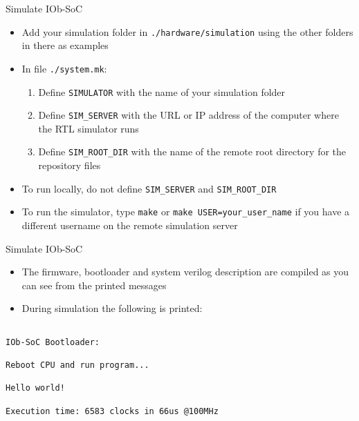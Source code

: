 \documentclass [xcolor=svgnames, t] {beamer}
\begin{document}
\begin{frame}[fragile]{Simulate IOb-SoC}
\begin{itemize}
  \item Add your simulation folder in {\tt ./hardware/simulation} using the other folders in there as examples
  \item In  file {\tt ./system.mk}:
  \begin{enumerate}
    \item Define {\tt SIMULATOR} with the name of your simulation folder
    \item Define {\tt SIM\_SERVER} with the URL or IP address of the computer where the RTL simulator runs
    \item Define {\tt SIM\_ROOT\_DIR} with the name of the remote root directory for the repository files
  \end{enumerate}
  \item To run locally, do not define {\tt SIM\_SERVER} and {\tt SIM\_ROOT\_DIR}
  \item To run the simulator, type {\tt make} or {\tt make USER=your\_user\_name} if you have a different username on the remote simulation server
\end{itemize}
\end{frame}


\begin{frame}[fragile]{Simulate IOb-SoC}
\begin{itemize}
  \item The firmware, bootloader and system verilog description are compiled as you can see from the printed messages
  \item During simulation the following is printed:
\end{itemize}
\begin{tiny}
\begin{lstlisting}

IOb-SoC Bootloader:

Reboot CPU and run program...

Hello world!

Execution time: 6583 clocks in 66us @100MHz

\end{lstlisting}
\end{tiny}
\end{frame}
\end{document}
